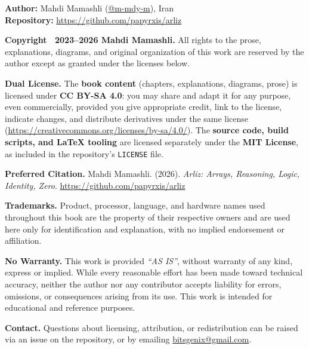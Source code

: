\begin{flushleft}
	{\small

	\textbf{Author:} Mahdi Mamashli (\href{https://github.com/m-mdy-m}{@m-mdy-m}), Iran\\
	\textbf{Repository:} \url{https://github.com/papyrxis/arliz}

	\vspace{0.8em}

	\textbf{Copyright \textcopyright\ 2023--2026 Mahdi Mamashli.} All rights to the prose,
	explanations, diagrams, and original organization of this work are reserved by the author
	except as granted under the licenses below.

	\vspace{0.8em}

	\textbf{Dual License.} The \textbf{book content} (chapters, explanations, diagrams, prose)
	is licensed under \textbf{CC BY-SA 4.0}: you may share and adapt it for any purpose, even
	commercially, provided you give appropriate credit, link to the license, indicate changes,
	and distribute derivatives under the same license
	(\url{https://creativecommons.org/licenses/by-sa/4.0/}). The \textbf{source code, build
	scripts, and LaTeX tooling} are licensed separately under the \textbf{MIT License}, as
	included in the repository's \texttt{LICENSE} file.

	\vspace{0.8em}

	\textbf{Preferred Citation.} Mahdi Mamashli. (2026). \textit{Arliz: Arrays, Reasoning, Logic,
	Identity, Zero}. \url{https://github.com/papyrxis/arliz}

	\vspace{0.8em}

	\textbf{Trademarks.} Product, processor, language, and hardware names used throughout this
	book are the property of their respective owners and are used here only for identification
	and explanation, with no implied endorsement or affiliation.

	\vspace{0.8em}

	\textbf{No Warranty.} This work is provided \textit{``AS IS''}, without warranty of any
	kind, express or implied. While every reasonable effort has been made toward technical
	accuracy, neither the author nor any contributor accepts liability for errors, omissions,
	or consequences arising from its use. This work is intended for educational and reference
	purposes.

	\vspace{0.8em}

	\textbf{Contact.} Questions about licensing, attribution, or redistribution can be raised
	via an issue on the repository, or by emailing
	\href{mailto:bitsgenix@gmail.com}{bitsgenix@gmail.com}.

	}
\end{flushleft}

\clearpage